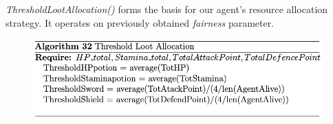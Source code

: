 

\textit{ThresholdLootAllocation()} forms the basis for our agent's resource allocation strategy. It operates on previously obtained \textit{fairness} parameter. 


\begin{figure}[htb]
    \centering
    \includegraphics[scale=0.7]{006_team_3_agent_design/FIGS/Algo32.png}
    \label{fig:algo32}
\end{figure}


